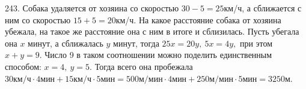 243. Собака удаляется от хозяина со скоростью $30-5=25$км/ч, а сближается с ним со скоростью $15+5=20$км/ч. На какое расстояние собака от хозяина убежала, на такое же расстояние она с ним в итоге и сблизилась. Пусть убегала она $x$ минут, а сближалась $y$ минут, тогда $25x=20y,\ 5x=4y,$ при этом $x+y=9.$ Число 9 в таком соотношении можно поделить единственным способом: $x=4,\ y=5.$ Тогда всего она пробежала $30\text{км/ч}\cdot4\text{мин}+15\text{км/ч}\cdot5\text{мин}=500\text{м/мин}\cdot4\text{мин}+
250\text{м/мин}\cdot5\text{мин}=3250$м.\\
